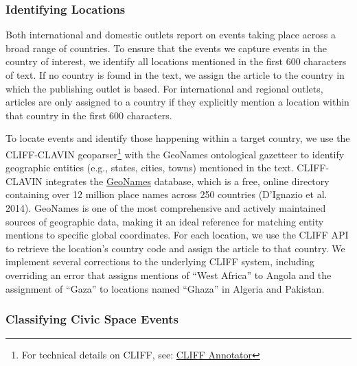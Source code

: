 \documentclass[
  letterpaper,
  DIV=11,
  numbers=noendperiod]{scrartcl}
\begin{document}
\hypertarget{identifying-locations}{%
\subsubsection{Identifying Locations}\label{identifying-locations}}

Both international and domestic outlets report on events taking place
across a broad range of countries. To ensure that the events we capture
events in the country of interest, we identify all locations mentioned
in the first 600 characters of text. If no country is found in the text,
we assign the article to the country in which the publishing outlet is
based. For international and regional outlets, articles are only
assigned to a country if they explicitly mention a location within that
country in the first 600 characters.

To locate events and identify those happening within a target country,
we use the CLIFF-CLAVIN geoparser\footnote{For technical details on
  CLIFF, see: \href{https://github.com/mediacloud/cliff-annotator}{CLIFF
  Annotator}} with the GeoNames ontological gazetteer to identify
geographic entities (e.g., states, cities, towns) mentioned in the text.
CLIFF-CLAVIN integrates the \href{https://www.geonames.org/}{GeoNames}
database, which is a free, online directory containing over 12 million
place names across 250 countries (D'Ignazio et al. 2014). GeoNames is
one of the most comprehensive and actively maintained sources of
geographic data, making it an ideal reference for matching entity
mentions to specific global coordinates. For each location, we use the
CLIFF API to retrieve the location's country code and assign the article
to that country. We implement several corrections to the underlying
CLIFF system, including overriding an error that assigns mentions of
\enquote{West Africa} to Angola and the assignment of \enquote{Gaza} to
locations named \enquote{Ghaza} in Algeria and Pakistan.

\hypertarget{classifying-civic-space-events}{%
\subsubsection{Classifying Civic Space
Events}\label{classifying-civic-space-events}}
\end{document}

